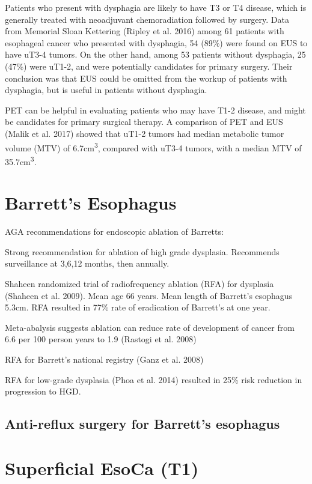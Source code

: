 \documentclass[
  letterpaper,
]{scrbook}
\begin{document}
Patients who present with dysphagia are likely to have T3 or T4 disease,
which is generally treated with neoadjuvant chemoradiation followed by
surgery. Data from Memorial Sloan Kettering (Ripley et al. 2016) among
61 patients with esophageal cancer who presented with dysphagia, 54
(89\%) were found on EUS to have uT3-4 tumors. On the other hand, among
53 patients without dysphagia, 25 (47\%) were uT1-2, and were
potentially candidates for primary surgery. Their conclusion was that
EUS could be omitted from the workup of patients with dysphagia, but is
useful in patients without dysphagia.

PET can be helpful in evaluating patients who may have T1-2 disease, and
might be candidates for primary surgical therapy. A comparison of PET
and EUS (Malik et al. 2017) showed that uT1-2 tumors had median
metabolic tumor volume (MTV) of 6.7cm\textsuperscript{3}, compared with
uT3-4 tumors, with a median MTV of 35.7cm\textsuperscript{3}.

\chapter{Barrett's Esophagus}\label{barretts-esophagus}

AGA recommendations for endoscopic ablation of Barretts:

Strong recommendation for ablation of high grade dysplasia. Recommends
surveillance at 3,6,12 months, then annually.

Shaheen randomized trial of radiofrequency ablation (RFA) for dysplasia
(Shaheen et al. 2009). Mean age 66 years. Mean length of Barrett's
esophagus 5.3cm. RFA resulted in 77\% rate of eradication of Barrett's
at one year.

Meta-abalysis suggests ablation can reduce rate of development of cancer
from 6.6 per 100 person years to 1.9 (Rastogi et al. 2008)

RFA for Barrett's national registry (Ganz et al. 2008)

RFA for low-grade dysplasia (Phoa et al. 2014) resulted in 25\% risk
reduction in progression to HGD.

\section{Anti-reflux surgery for Barrett's
esophagus}\label{anti-reflux-surgery-for-barretts-esophagus}

\chapter{Superficial EsoCa (T1)}\label{superficial}
\end{document}
